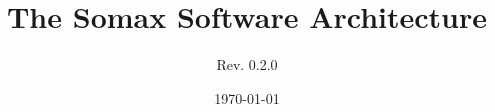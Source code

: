 \documentclass[10pt]{article}
\title{The Somax Software Architecture}
\author{Rev. 0.2.0}
\date{\today}
\begin{document}
\maketitle






{}

\end{document}
